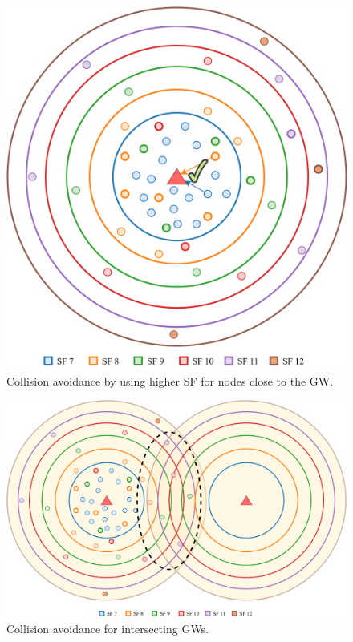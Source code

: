\documentclass[conference]{IEEEtran}
\begin{document}
\begin{figure}
\centering
\includegraphics[width=\linewidth]{collision_solution_single_gw}
\caption{Collision avoidance by using higher SF for nodes close to the GW.}
\label{fig:collision_solution_single_gw}
\end{figure}

\begin{figure}
\centering
\includegraphics[width=\linewidth]{collision_solution_multi_gw}
\caption{Collision avoidance for intersecting GWs.}
\label{fig:collision_solution_multi_gw}
\end{figure}
\end{document}
